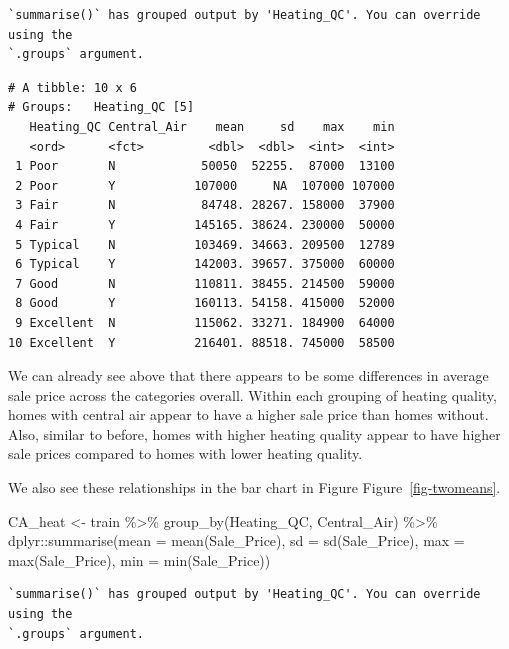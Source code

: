 \documentclass[
  letterpaper,
  DIV=11,
  numbers=noendperiod]{scrreprt}
\newenvironment{Shaded}{\begin{snugshade}}{\end{snugshade}}
\newcommand{\AttributeTok}[1]{\textcolor[rgb]{0.40,0.45,0.13}{#1}}
\newcommand{\FunctionTok}[1]{\textcolor[rgb]{0.28,0.35,0.67}{#1}}
\newcommand{\NormalTok}[1]{\textcolor[rgb]{0.00,0.23,0.31}{#1}}
\newcommand{\OtherTok}[1]{\textcolor[rgb]{0.00,0.23,0.31}{#1}}
\newcommand{\SpecialCharTok}[1]{\textcolor[rgb]{0.37,0.37,0.37}{#1}}
\begin{document}
\begin{verbatim}
`summarise()` has grouped output by 'Heating_QC'. You can override using the
`.groups` argument.
\end{verbatim}

\begin{verbatim}
# A tibble: 10 x 6
# Groups:   Heating_QC [5]
   Heating_QC Central_Air    mean     sd    max    min
   <ord>      <fct>         <dbl>  <dbl>  <int>  <int>
 1 Poor       N            50050  52255.  87000  13100
 2 Poor       Y           107000     NA  107000 107000
 3 Fair       N            84748. 28267. 158000  37900
 4 Fair       Y           145165. 38624. 230000  50000
 5 Typical    N           103469. 34663. 209500  12789
 6 Typical    Y           142003. 39657. 375000  60000
 7 Good       N           110811. 38455. 214500  59000
 8 Good       Y           160113. 54158. 415000  52000
 9 Excellent  N           115062. 33271. 184900  64000
10 Excellent  Y           216401. 88518. 745000  58500
\end{verbatim}

We can already see above that there appears to be some differences in
average sale price across the categories overall. Within each grouping
of heating quality, homes with central air appear to have a higher sale
price than homes without. Also, similar to before, homes with higher
heating quality appear to have higher sale prices compared to homes with
lower heating quality.

We also see these relationships in the bar chart in Figure
Figure~\ref{fig-twomeans}.

\begin{Shaded}
\begin{Highlighting}[]
\NormalTok{CA\_heat }\OtherTok{\textless{}{-}}\NormalTok{ train }\SpecialCharTok{\%\textgreater{}\%} 
  \FunctionTok{group\_by}\NormalTok{(Heating\_QC, Central\_Air) }\SpecialCharTok{\%\textgreater{}\%}
\NormalTok{  dplyr}\SpecialCharTok{::}\FunctionTok{summarise}\NormalTok{(}\AttributeTok{mean =} \FunctionTok{mean}\NormalTok{(Sale\_Price), }
            \AttributeTok{sd =} \FunctionTok{sd}\NormalTok{(Sale\_Price), }
            \AttributeTok{max =} \FunctionTok{max}\NormalTok{(Sale\_Price), }
            \AttributeTok{min =} \FunctionTok{min}\NormalTok{(Sale\_Price))}
\end{Highlighting}
\end{Shaded}

\begin{verbatim}
`summarise()` has grouped output by 'Heating_QC'. You can override using the
`.groups` argument.
\end{verbatim}
\end{document}
